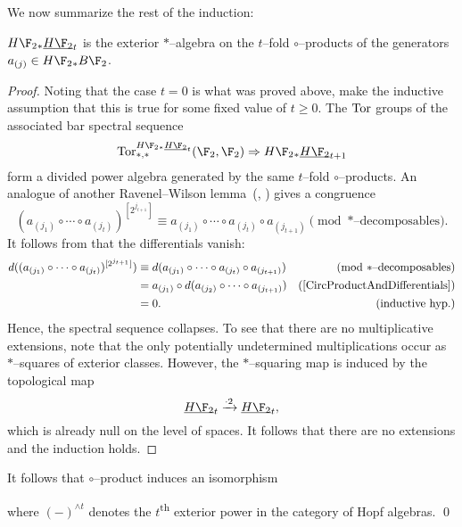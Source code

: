 We now summarize the rest of the induction:
\begin{theorem}\label{UnstableSteenrodInduction}
$H\F_2{}_* \OS{H\F_2}{t}$ is the exterior $\ast$--algebra on the $t$--fold $\circ$--products of the generators $a_{(j)} \in H\F_2{}_* B\F_2$.
\end{theorem}
\begin{proof}
Noting that the case $t = 0$ is what was proved above, make the inductive assumption that this is true for some fixed value of $t \ge 0$.  The $\operatorname{Tor}$ groups of the associated bar spectral sequence \[\Tor^{H\F_2{}_* \OS{H\F_2}{t}}_{*, *}(\F_2, \F_2) \Rightarrow H\F_2{}_* \OS{H\F_2}{t+1}\] form a divided power algebra generated by the same $t$--fold $\circ$--products.  An analogue of another Ravenel--Wilson lemma~(\cite[Lemma 9.5]{RavenelWilsonKthyOfEMSpaces}, \cite[Claim 8.16]{Wilson}) gives a congruence \[(a_{(j_1)} \circ \cdots \circ a_{(j_t)})^{[2^{j_{t+1}}]} \equiv a_{(j_1)} \circ \cdots \circ a_{(j_t)} \circ a_{(j_{t+1})} \pmod{\text{$\ast$--decomposables}}.\]  It follows from  that the differentials vanish:
\begin{align*}
d((a_{(j_1)} \circ \cdots \circ a_{(j_t)})^{[2^{j_{t+1}}]}) & \equiv d(a_{(j_1)} \circ \cdots \circ a_{(j_t)} \circ a_{(j_{t+1})}) & \text{(mod $\ast$--decomposables)} \\
& = a_{(j_1)} \circ d(a_{(j_2)} \circ \cdots \circ a_{(j_{t+1})}) & \text{(\Cref{CircProductAndDifferentials})} \\
& = 0. & \text{(inductive hyp.)}
\end{align*}
Hence, the spectral sequence collapses.  To see that there are no multiplicative extensions, note that the only potentially undetermined multiplications occur as $\ast$--squares of exterior classes.  However, the $\ast$--squaring map is induced by the topological map \[\OS{H\F_2}{t} \xrightarrow{\cdot 2} \OS{H\F_2}{t},\] which is already null on the level of spaces.  It follows that there are no extensions and the induction holds.
\end{proof}

\begin{corollary}
It follows that $\circ$--product induces an isomorphism
\begin{center}
\end{center}
where $(-)^{\wedge t}$ denotes the $t$\textsuperscript{th} exterior power in the category of Hopf algebras. \qed
\end{corollary}

